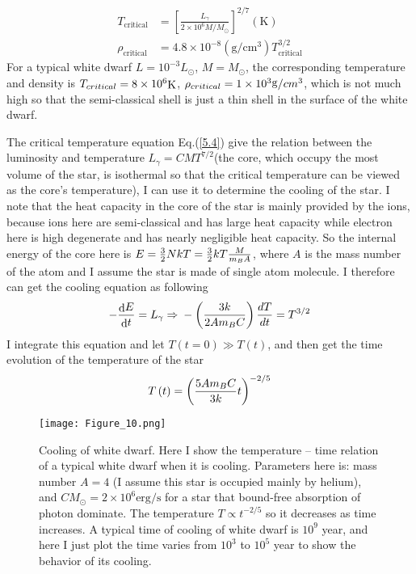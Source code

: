 \documentclass[reprint]{revtex4-1}
\begin{document}
\begin{align}
T_{\text{critical}}&=[\frac{L_{\gamma}}{2\times10^6M/M_{\odot}}]^{2/7}(\text{K}) \label{5.4}\\
\rho_{\text{critical}}&=4.8\times10^{-8}(\text{g}/\text{cm}^3)T_{\text{critical}}^{3/2} \label{5.5}
\end{align}
For a typical white dwarf $L=10^{-3}L_{\odot}$, $M=M_{\odot}$, the corresponding temperature and density is ${T_{critical}} = 8 \times {10^6}{\mathop{\rm K}\nolimits} $, ${\rho _{critical}} = 1 \times {10^3}{\mathop{\rm g}\nolimits} /c{m^3}$, which is not much high so that the semi-classical shell is just a thin shell in the surface of the white dwarf.\par
The critical temperature equation Eq.(\ref{5.4}) give the relation between the luminosity and temperature ${L_\gamma } = CM{T^{7/2}}$(the core, which occupy the most volume of the star, is isothermal so that the critical temperature can be viewed as the core’s temperature), I can use it to determine the cooling of the star. I note that the heat capacity in the core of the star is mainly provided by the ions, because ions here are semi-classical and has large heat capacity while electron here is high degenerate and has nearly negligible heat capacity. So the internal energy of the core here is $E = {3 \over 2}NkT = {3 \over 2}kT{M \over {{m_B}A}}$, where $A$ is the mass number of the atom and I assume the star is made of single atom molecule. I therefore can get the cooling equation as following
\begin{equation}
 - {{{\mathop{\rm d}\nolimits} E} \over {{\mathop{\rm d}\nolimits} t}} = {L_\gamma }{\rm{    }} \Rightarrow {\rm{    }} - \left( {{{3k} \over {2A{m_B}C}}} \right){{dT} \over {dt}} = {T^{3/2}} \label{5.6}
\end{equation}
I integrate this equation and let $T\left( {t = 0} \right) \gg T\left( t \right)$, and then get the time evolution of the temperature of the star
\begin{equation}
T\left( t \right) = {\left( {{{5A{m_B}C} \over {3k}}t} \right)^{ - 2/5}} \label{5.7}
\end{equation}
\begin{figure}
	\centering   
	\texttt{[image: Figure\_10.png]}  
	\caption{Cooling of white dwarf. Here I show the temperature – time relation of a typical white dwarf when it is cooling. Parameters here is: mass number $A=4$ (I assume this star is occupied mainly by helium), and $CM_{\odot}=2\times10^{6}\text{erg}/\text{s}$ for a star that bound-free absorption of photon dominate. The temperature $T\propto t^{-2/5}$  so it decreases as time increases. A typical time of cooling of white dwarf is $10^9$  year, and here I just plot the time varies from $10^3$  to $10^5$  year to show the behavior of its cooling.} 
	\label{fig:10} 
\end{figure}
\end{document}
